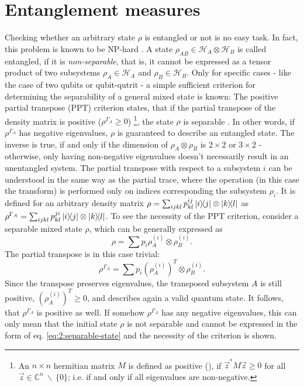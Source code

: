 \section{Entanglement measures}\label{sec:2:entanglement-measures}
Checking whether an arbitrary state $\rho$ is entangled or not is no easy task. In fact, this problem is known to be NP-hard \cite{Gurvits_2003}.
A state $\rho_{AB} \in \mathcal{H}_A\otimes\mathcal{H}_B$ is called entangled, if it is \emph{non-separable}, that is, it cannot be expressed as a tensor product of two subsystems $\rho_A \in \mathcal{H}_A$ and $\rho_B \in \mathcal{H}_B$.
Only for specific cases - like the case of two qubits or qubit-qutrit - a simple sufficient criterion for determining the separability of a general mixed state is known:
The positive partial transpose (PPT) criterion states, that if the partial transpose of the density matrix is positive ($\rho^{\Gamma_A} \geq 0$) \footnote{An $n \times n$ hermitian matrix $M$ is defined as positive (), if $\vec{z}^*M\vec{z} \geq 0$ for all $\vec{z}\in\mathbb{C}^n \ \backslash \ \{0\}$; i.e. if and only if all eigenvalues are non-negative.}, the state $\rho$ is separable \cite{Horodecki_2009,Plenio_2005a}.
In other words, if $\rho^{\Gamma_A}$ has negative eigenvalues, $\rho$ is guaranteed to describe an entangled state.
The inverse is true, if and only if the dimension of $\rho_A\otimes\rho_B$ is $2\times2$ or $3\times2$ \cite{Horodecki_2009} - otherwise, only having non-negative eigenvalues doesn't necessarily result in an unentangled system.
The partial transpose with respect to a subsystem $i$ can be understood in the same way as the partial trace, where the operation (in this case the transform) is performed only on indices corresponding the subsystem $\rho_i$.
It is defined for an arbitrary density matrix $\rho = \sum_{ijkl}p^{ij}_{kl}\ketbra{i}{j}\otimes\ketbra{k}{l}$ as $\rho^{\Gamma_A} = \sum_{ijkl}p^{ji}_{kl}\ketbra{i}{j}\otimes\ketbra{k}{l}$.
To see the necessity of the PPT criterion, consider a separable mixed state $\rho$, which can be generally expressed as 
\begin{equation}\label{eq:2:separable-state}
  \rho = \sum p_i \rho_{A}^{(i)}\otimes\rho_{B}^{(i)} .
\end{equation}
The partial transpose is in this case trivial:
\begin{equation}
  \rho^{\Gamma_A} = \sum p_i (\rho_{A}^{(i)})^T \otimes \rho_{B}^{(i)} .
\end{equation}
Since the transpose preserves eigenvalues, the transposed subsystem $A$ is still positive, $(\rho_{A}^{(i)})^T \geq 0$, and describes again a valid quantum state. It follows, that $\rho^{\Gamma_A}$ is positive as well.
If somehow $\rho^{\Gamma_A}$ has any negative eigenvalues, this can only mean that the initial state $\rho$ is not separable and cannot be expressed in the form of eq. \eqref{eq:2:separable-state} and the necessity of the criterion is shown.

